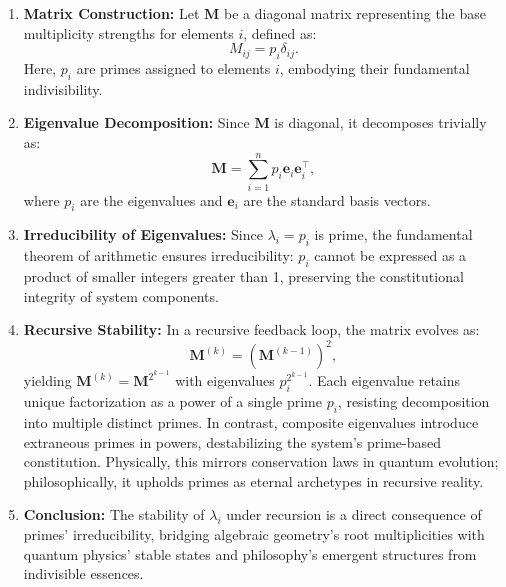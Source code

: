 \documentclass{article}
\theoremstyle{plain}
\begin{document}
\begin{enumerate}
\item \textbf{Matrix Construction:} Let $\mathbf{M}$ be a diagonal matrix representing the base multiplicity strengths for elements $i$, defined as:
\begin{equation}
M_{ij} = p_i \delta_{ij}.
\end{equation}
Here, $p_i$ are primes assigned to elements $i$, embodying their fundamental indivisibility.
\item \textbf{Eigenvalue Decomposition:} Since $\mathbf{M}$ is diagonal, it decomposes trivially as:
\begin{equation}
\mathbf{M} = \sum_{i=1}^n p_i \mathbf{e}_i \mathbf{e}_i^\top,
\end{equation}
where $p_i$ are the eigenvalues and $\mathbf{e}_i$ are the standard basis vectors.
\item \textbf{Irreducibility of Eigenvalues:} Since $\lambda_i = p_i$ is prime, the fundamental theorem of arithmetic ensures irreducibility: $p_i$ cannot be expressed as a product of smaller integers greater than 1, preserving the constitutional integrity of system components.
\item \textbf{Recursive Stability:} In a recursive feedback loop, the matrix evolves as:
\begin{equation}
\mathbf{M}^{(k)} = \left( \mathbf{M}^{(k-1)} \right)^2,
\end{equation}
yielding $\mathbf{M}^{(k)} = \mathbf{M}^{2^{k-1}}$ with eigenvalues $p_i^{2^{k-1}}$. Each eigenvalue retains unique factorization as a power of a single prime $p_i$, resisting decomposition into multiple distinct primes. In contrast, composite eigenvalues introduce extraneous primes in powers, destabilizing the system's prime-based constitution. Physically, this mirrors conservation laws in quantum evolution; philosophically, it upholds primes as eternal archetypes in recursive reality.
\item \textbf{Conclusion:} The stability of $\lambda_i$ under recursion is a direct consequence of primes' irreducibility, bridging algebraic geometry's root multiplicities with quantum physics' stable states and philosophy's emergent structures from indivisible essences.
\end{enumerate}
\end{document}
